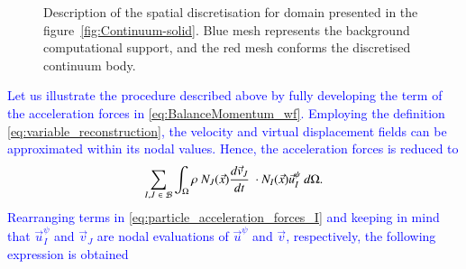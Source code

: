 \documentclass[preprint,12pt,a4paper]{elsarticle}
\newcommand{\Integral}[2]{
  \IfStrEqCase{#1}{
    {2}{\ensuremath{\int_{\Gamma_d}{#2}\ d\Gamma}}
    {3}{\ensuremath{\int_{\Omega}{#2}\ d\Omega}}
  }
}
\begin{document}
\begin{figure}
  \centering
  \caption{Description of the spatial discretisation for domain presented in the
    figure~\ref{fig:Continuum-solid}. Blue mesh represents the
    background computational support, and the red mesh conforms the
    discretised continuum body.}
  \label{fig:MPM-discretization}
\end{figure}
\textcolor{blue}{Let us illustrate the procedure described above by fully developing the term of the acceleration forces in \eqref{eq:BalanceMomentum_wf}. Employing the definition \eqref{eq:variable_reconstruction}, the velocity and virtual displacement fields can be approximated within its nodal values. Hence, the acceleration forces is reduced to}
\begin{equation}
    \label{eq:particle_acceleration_forces_I}
    \sum_{I,J\ \in\ \mathcal{B}} \Integral{3}{ \rho\ N_J(\vec{x})  \frac{d\vec{v}_J}{dt}\ \cdot N_I(\vec{x})\vec{u}_I^{\psi}}.
\end{equation}
\textcolor{blue}{Rearranging terms in \ref{eq:particle_acceleration_forces_I} and keeping in mind that $\vec{u}_I^{\psi}$ and $\vec{v}_J$ are nodal evaluations of $\vec{u}^{\psi}$ and $\vec{v}$, respectively,  the following expression is obtained}
\end{document}
